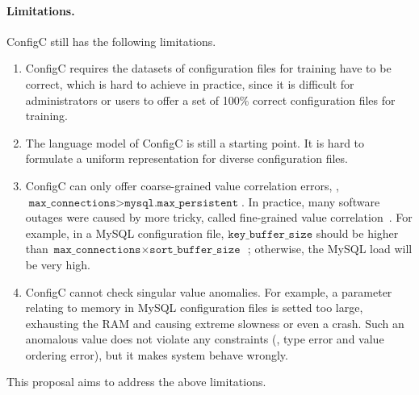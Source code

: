 \paragraph{Limitations.}
ConfigC still has the following limitations.

\begin{enumerate}

\item ConfigC requires the datasets of configuration files for training 
  have to be correct, which is hard to achieve in practice, since 
  it is difficult for administrators or users to offer a
  set of 100\% correct configuration files for training.

\item The language model of ConfigC is still a starting point. It
  is hard to formulate a uniform representation for diverse
  configuration files.

\item ConfigC can only offer coarse-grained value correlation errors,
  \eg, $\texttt{max\_connections} > \texttt{mysql.max\_persistent}$.
  In practice, many software outages were caused by more tricky, called
  fine-grained value correlation~\cite{correlation}. For example, 
  in a MySQL configuration file, $\texttt{key\_buffer\_size}$ should be 
  higher than $\texttt{max\_connections} \times 
  \texttt{sort\_buffer\_size}$~\cite{correlation};
  otherwise, the MySQL load will be very high.

\item ConfigC cannot check singular value anomalies. For example,
  a parameter relating to memory in MySQL configuration files is
  setted too large, exhausting the RAM and causing extreme slowness
  or even a crash. Such an anomalous value does not violate any
  constraints (\eg, type error and value ordering error), but 
  it makes system behave wrongly.

\end{enumerate}

This proposal aims to address the above limitations. 
